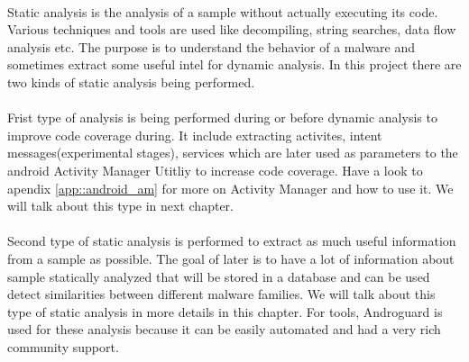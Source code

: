 \documentclass[../main.tex]{subfile}
\begin{document}
	
		\paragraph{} Static analysis is the analysis of a sample without actually executing its code. Various techniques and tools are used like decompiling, string searches, data flow analysis etc. The purpose is to understand the behavior of a malware and sometimes extract some useful intel for dynamic analysis. In this project there are two kinds of static analysis being performed.
		\paragraph{} Frist type of analysis is being performed during or before dynamic analysis to improve code coverage during. It include extracting activites, intent messages(experimental stages), services which are later used as parameters to the android Activity Manager Utitliy to increase code coverage. Have a look to apendix \ref{app::android_am} for more on Activity Manager and how to use it. We will talk about this type in next chapter.
		
		\paragraph{} Second type of static analysis is performed to extract as much useful information from a sample as possible. The goal of later is to have a lot of information about sample statically analyzed that will be stored in a database and can be used detect similarities between different malware families. We will talk about this type of static analysis in more details in this chapter. For tools, Androguard is used for these analysis because it can be easily automated and had a very rich community support.
\end{document}
